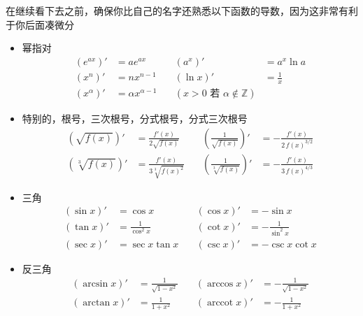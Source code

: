 \documentclass[lang=cn,newtx,10pt,scheme=chinese]{elegantbook}
\DeclareMathOperator{\arccot}{arccot}
\begin{document}
在继续看下去之前，确保你比自己的名字还熟悉以下函数的导数，因为这非常有利于你后面凑微分

\begin{itemize}
  \item 幂指对 
  \begin{equation}
    \begin{aligned}
      (e^{ax})'&=ae^{ax} &\quad (a^{x})'&= a^{x}\ln a\\
      (x^{n})'&=n x^{n-1} &\quad (\ln x)'&=\frac{1}{x}\\
      (x^{\alpha})'&=\alpha x^{\alpha-1} &\quad (x>0\text{ 若 }\alpha\notin\mathbb{Z})
    \end{aligned}
  \end{equation}

  \item 特别的，根号，三次根号，分式根号，分式三次根号
  \begin{equation}
    \begin{aligned}
      (\sqrt{f(x)})'&=\frac{f'(x)}{2\sqrt{f(x)}} &\quad \left(\frac{1}{\sqrt{f(x)}}\right)'&=-\frac{f'(x)}{2\,f(x)^{3/2}} \\
      (\sqrt[3]{f(x)})'&=\frac{f'(x)}{3\sqrt[3]{f(x)^{2}}} &\quad \left(\frac{1}{\sqrt[3]{f(x)}}\right)'&=-\frac{f'(x)}{3\,f(x)^{4/3}}
    \end{aligned}
  \end{equation}

  \item 三角
  \begin{equation}
    \begin{aligned}
      (\sin x)'&=\cos x &\quad (\cos x)'&=-\sin x \\
      (\tan x)'&=\frac{1}{\cos^{2}x} &\quad (\cot x)'&=-\frac{1}{\sin^{2}x} \\
      (\sec x)'&=\sec x\tan x &\quad (\csc x)'&=-\csc x\cot x
    \end{aligned}
  \end{equation}

  \item 反三角
  \begin{equation}
    \begin{aligned}
      (\arcsin x)'&=\frac{1}{\sqrt{1-x^{2}}} &\quad (\arccos x)'&=-\frac{1}{\sqrt{1-x^{2}}} \\
      (\arctan x)'&=\frac{1}{1+x^{2}} &\quad (\arccot x)'&=-\frac{1}{1+x^{2}}
    \end{aligned}
  \end{equation}


\end{itemize}
\end{document}
